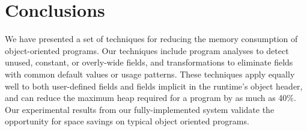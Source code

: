 \documentclass{acmconf}
\begin{document}
\section{Conclusions}
%
We have presented a set of techniques for reducing the memory
consumption of object-oriented programs.  Our techniques include
program analyses to detect unused, constant, or overly-wide fields,
and transformations to eliminate fields with common default values
or usage patterns.  These techniques apply equally well to
both user-defined fields and
fields implicit in the runtime's object header, and can reduce the
maximum heap required for a program by as much as 40\%. 
Our experimental results from our fully-implemented system validate the
opportunity for space savings on typical object oriented programs.

\renewcommand{\baselinestretch}{1}


%
\end{document}
